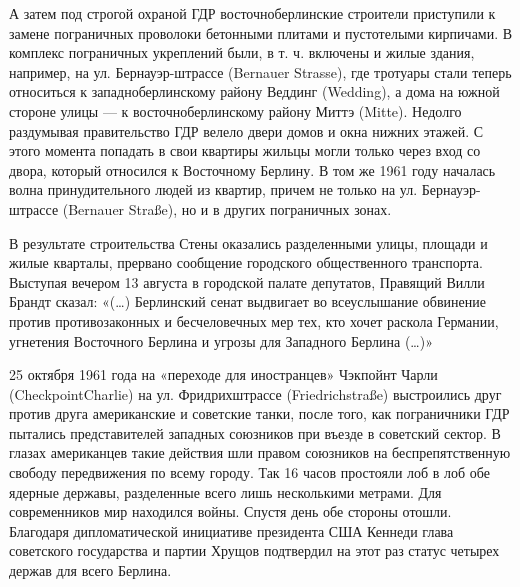 А затем под строгой охраной  ГДР восточноберлинские строители приступили к замене пограничных  проволоки бетонными плитами и пустотелыми кирпичами. В комплекс пограничных укреплений были, в т. ч. включены и жилые здания, например, на ул. Бернауэр-штрассе (Bernauer Strasse), где тротуары стали теперь относиться к западноберлинскому району Веддинг (Wedding), а дома на южной стороне улицы --- к восточноберлинскому району Миттэ (Mitte). Недолго раздумывая правительство ГДР велело  двери домов и окна нижних этажей. С этого момента попадать в свои квартиры жильцы могли только через вход со двора, который относился к Восточному Берлину. В том же 1961 году началась волна принудительного  людей из квартир, причем не только на ул. Бернауэр-штрассе (Bernauer Straße), но и в других пограничных зонах.

В результате строительства Стены  оказались разделенными улицы, площади и жилые кварталы, прервано сообщение городского общественного транспорта. Выступая вечером 13 августа в городской палате депутатов, Правящий  Вилли Брандт сказал: «(…) Берлинский сенат выдвигает во всеуслышание обвинение против противозаконных и бесчеловечных мер тех, кто хочет раскола Германии, угнетения Восточного Берлина и угрозы для Западного Берлина (…)»

25 октября 1961 года на «переходе для иностранцев» Чэкпойнт Чарли (CheckpointCharlie) на ул. Фридрихштрассе (Friedrichstraße) выстроились друг против друга американские и советские танки, после того, как пограничники ГДР пытались  представителей западных союзников при въезде в советский сектор. В глазах американцев такие действия шли  правом союзников на беспрепятственную свободу передвижения по всему городу. Так 16 часов простояли лоб в лоб обе ядерные державы, разделенные всего лишь несколькими метрами. Для современников мир находился  войны. Спустя день обе стороны отошли. Благодаря дипломатической инициативе президента США Кеннеди глава советского государства и партии Хрущов подтвердил на этот раз статус четырех держав для всего Берлина.

